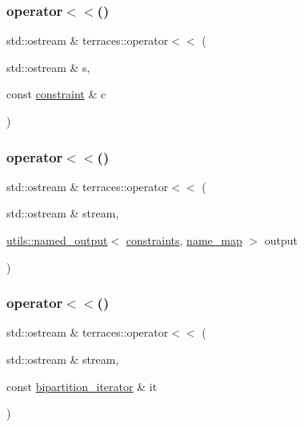 \subsubsection{\texorpdfstring{operator$<$$<$()}{operator<<()}\hspace{0.1cm}{\footnotesize\ttfamily [1/7]}}
{\footnotesize\ttfamily std\+::ostream \& terraces\+::operator$<$$<$ (\begin{DoxyParamCaption}\item[{std\+::ostream \&}]{s,  }\item[{const \hyperlink{structterraces_1_1constraint}{constraint} \&}]{c }\end{DoxyParamCaption})}

\mbox{\label{namespaceterraces_afda20576b9d2f9c56f3f6d06efc030fd}} 
\subsubsection{\texorpdfstring{operator$<$$<$()}{operator<<()}\hspace{0.1cm}{\footnotesize\ttfamily [2/7]}}
{\footnotesize\ttfamily std\+::ostream \& terraces\+::operator$<$$<$ (\begin{DoxyParamCaption}\item[{std\+::ostream \&}]{stream,  }\item[{\hyperlink{structterraces_1_1utils_1_1named__output}{utils\+::named\+\_\+output}$<$ \hyperlink{namespaceterraces_a6f603ffd30ed4d902fce6424492e0581}{constraints}, \hyperlink{namespaceterraces_a4ef0217fe5aed881737d9bc5a8d45dca}{name\+\_\+map} $>$}]{output }\end{DoxyParamCaption})}

\mbox{\label{namespaceterraces_a746aa89cd7b3de5dc7dcc7bc90b08e74}} 
\subsubsection{\texorpdfstring{operator$<$$<$()}{operator<<()}\hspace{0.1cm}{\footnotesize\ttfamily [3/7]}}
{\footnotesize\ttfamily std\+::ostream \& terraces\+::operator$<$$<$ (\begin{DoxyParamCaption}\item[{std\+::ostream \&}]{stream,  }\item[{const \hyperlink{classterraces_1_1bipartition__iterator}{bipartition\+\_\+iterator} \&}]{it }\end{DoxyParamCaption})}

